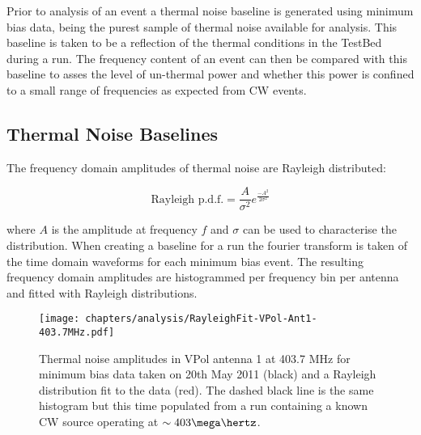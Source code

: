 Prior to analysis of an event a thermal noise baseline is generated using minimum bias data, being the purest sample of thermal noise available for analysis. This baseline is taken to be a reflection of the thermal conditions in the TestBed during a run. The frequency content of an event can then be compared with this baseline to asses the level of un-thermal power and whether this power is confined to a small range of frequencies as expected from CW events.

\subsection{Thermal Noise Baselines}
\label{sec:Analysis:CWRemoval:Baselines}

The frequency domain amplitudes of thermal noise are Rayleigh distributed:

\begin{equation}
  \mbox{Rayleigh p.d.f.} = \frac{A}{\sigma^{2}}e^{\frac{-A^{2}}{2\sigma^{2}}}
  \label{eq:Analysis:CWRemoval:Rayleigh-pdf}
\end{equation}

\noindent where $A$ is the amplitude at frequency $f$ and $\sigma$ can be used to characterise the distribution. When creating a baseline for a run the fourier transform is taken of the time domain waveforms for each minimum bias event. The resulting frequency domain amplitudes are histogrammed per frequency bin per antenna and fitted with Rayleigh distributions.


\begin{figure}[htpb]
  \centering
  \texttt{[image: chapters/analysis/RayleighFit-VPol-Ant1-403.7MHz.pdf]}
  \caption{Thermal noise amplitudes in VPol antenna 1 at 403.7 MHz for minimum bias data taken on 20th May 2011 (black) and a Rayleigh distribution fit to the data (red). The dashed black line is the same histogram but this time populated from a run containing a known CW source operating at $\sim 403 \mega \hertz$.}
  \label{fig:analysis:CWRemoval:Baselines:Rayleigh-Fit}
\end{figure}




